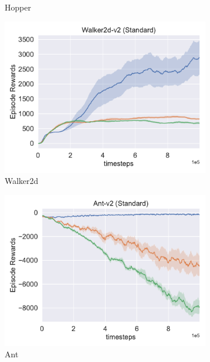 \begin{figure}[h!]
\begin{subfigure}[t]{0.49\textwidth}
    \caption{Hopper}
  \end{subfigure}\hfill
  \begin{subfigure}[t]{0.49\textwidth}
    \includegraphics[width=\textwidth]{figures/chapter5/r_in_only/walker2d.pdf}
    \caption{Walker2d}
  \end{subfigure}\hfill
  \begin{subfigure}[t]{0.49\textwidth}
    \includegraphics[width=\textwidth]{figures/chapter5/r_in_only/ant.pdf}
    \caption{Ant}
  \end{subfigure}\hfill
  \begin{subfigure}[t]{0.49\textwidth}

\end{subfigure}
\end{figure}
